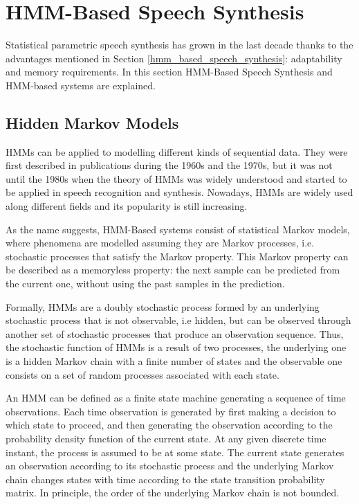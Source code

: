 \section{HMM-Based Speech Synthesis}
\label{hmm_synthesis}
Statistical parametric speech synthesis has grown in the last decade thanks to the advantages mentioned in Section \ref{hmm_based_speech_synthesis}: adaptability and memory requirements. In this section HMM-Based Speech Synthesis and HMM-based systems are explained.

\subsection{Hidden Markov Models}
\label{hmm_syntheis_markov}
HMMs can be applied to modelling different kinds of sequential data.
%
They were first described in publications during the 1960s and the 1970s, but it was not until the 1980s when the theory of HMMs was widely understood and started to be applied in speech recognition and synthesis.
%
Nowadays, HMMs are widely used along different fields and its popularity is still increasing.

As the name suggests, HMM-Based systems consist of statistical Markov models, where phenomena are modelled assuming they are Markov processes, i.e. stochastic processes that satisfy the Markov property.
%
This Markov property can be described as a memoryless property: the next sample can be predicted from the current one, without using the past samples in the prediction.

Formally, HMMs are a doubly stochastic process formed by an underlying stochastic process that is not observable, i.e hidden, but can be observed through another set of stochastic processes that produce an observation sequence. 
%
Thus, the stochastic function of HMMs is a result of two processes, the underlying one is a hidden Markov chain with a finite number of states and the observable one consists on a set of random processes associated with each state.

An HMM can be defined as a finite state machine generating a sequence of time observations.
%
Each time observation is generated by first making a decision to which state to proceed, and then generating the observation according to the probability density function of the current state.
%
At any given discrete time instant, the process is assumed to be at some state.
%
The current state generates an observation according to its stochastic process and the underlying Markov chain changes states with time according to the state transition probability matrix. 
%
In principle, the order of the underlying Markov chain is not bounded.

